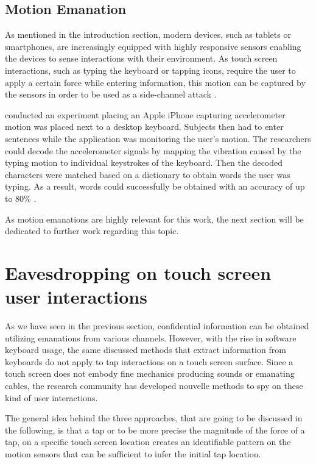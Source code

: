 \subsection{Motion Emanation}
As mentioned in the introduction section, modern devices, such as tablets or smartphones, are increasingly equipped with highly responsive sensors enabling the devices to sense interactions with their environment. As touch screen interactions, such as typing the keyboard or tapping icons, require the user to apply a certain force while entering information, this motion can be captured by the sensors in order to be used as a side-channel attack \cite{Tapprints,Accessory,Touchlogger}.

\citeauthor{Marquardt:2011:IDV:2046707.2046771} conducted an experiment placing an Apple iPhone capturing accelerometer motion was placed next to a desktop keyboard. Subjects then had to enter sentences while the application was monitoring the user's motion. The researchers could decode the accelerometer signals by mapping the vibration caused by the typing motion to individual keystrokes of the keyboard. Then the decoded characters were matched based on a dictionary to obtain words the user was typing. As a result, words could successfully be obtained with an accuracy of up to 80\% \cite{Marquardt:2011:IDV:2046707.2046771}.

As motion emanations are highly relevant for this work, the next section will be dedicated to further work regarding this topic.

\section{Eavesdropping on touch screen user interactions}
As we have seen in the previous section, confidential information can be obtained utilizing emanations from various channels. However, with the rise in software keyboard usage, the same discussed methods that extract information from keyboards do not apply to tap interactions on a touch screen surface. Since a touch screen does not embody fine mechanics producing sounds or emanating cables, the research community has developed nouvelle methods to spy on these kind of user interactions.

The general idea behind the three approaches, that are going to be discussed in the following, is that a tap or to be more precise the magnitude of the force of a tap, on a specific touch screen location creates an identifiable pattern on the motion sensors that can be sufficient to infer the initial tap location.


